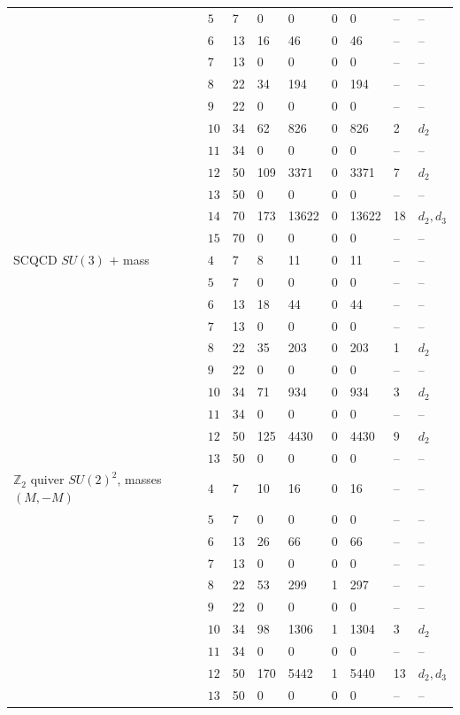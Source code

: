 \documentclass[11pt]{article}
\numberwithin{equation}{section}
\numberwithin{figure}{section}
\numberwithin{table}{section}
\begin{document}
{\begin{xltabular}{\linewidth}{@{}>{\raggedright\arraybackslash}Xllllllll@{}}
 & $5$ & 7 & 0 & 0 & 0 & 0 & -- & --\\
 & $6$ & 13 & 16 & 46 & 0 & 46 & -- & --\\
 & $7$ & 13 & 0 & 0 & 0 & 0 & -- & --\\
 & $8$ & 22 & 34 & 194 & 0 & 194 & -- & --\\
 & $9$ & 22 & 0 & 0 & 0 & 0 & -- & --\\
 & $10$ & 34 & 62 & 826 & 0 & 826 & 2 & $d_2$\\
 & $11$ & 34 & 0 & 0 & 0 & 0 & -- & --\\
 & $12$ & 50 & 109 & 3371 & 0 & 3371 & 7 & $d_2$\\
 & $13$ & 50 & 0 & 0 & 0 & 0 & -- & --\\
 & $14$ & 70 & 173 & 13622 & 0 & 13622 & 18 & $d_2,d_3$\\
 & $15$ & 70 & 0 & 0 & 0 & 0 & -- & --\\
SCQCD $SU(3)$ $+$ mass & $4$ & 7 & 8 & 11 & 0 & 11 & -- & --\\
 & $5$ & 7 & 0 & 0 & 0 & 0 & -- & --\\
 & $6$ & 13 & 18 & 44 & 0 & 44 & -- & --\\
 & $7$ & 13 & 0 & 0 & 0 & 0 & -- & --\\
 & $8$ & 22 & 35 & 203 & 0 & 203 & 1 & $d_2$\\
 & $9$ & 22 & 0 & 0 & 0 & 0 & -- & --\\
 & $10$ & 34 & 71 & 934 & 0 & 934 & 3 & $d_2$\\
 & $11$ & 34 & 0 & 0 & 0 & 0 & -- & --\\
 & $12$ & 50 & 125 & 4430 & 0 & 4430 & 9 & $d_2$\\
 & $13$ & 50 & 0 & 0 & 0 & 0 & -- & --\\
$\mathbb Z_2$ quiver $SU(2)^2$, masses $(M,-M)$ & $4$ & 7 & 10 & 16 & 0 & 16 & -- & --\\
 & $5$ & 7 & 0 & 0 & 0 & 0 & -- & --\\
 & $6$ & 13 & 26 & 66 & 0 & 66 & -- & --\\
 & $7$ & 13 & 0 & 0 & 0 & 0 & -- & --\\
 & $8$ & 22 & 53 & 299 & 1 & 297 & -- & --\\
 & $9$ & 22 & 0 & 0 & 0 & 0 & -- & --\\
 & $10$ & 34 & 98 & 1306 & 1 & 1304 & 3 & $d_2$\\
 & $11$ & 34 & 0 & 0 & 0 & 0 & -- & --\\
 & $12$ & 50 & 170 & 5442 & 1 & 5440 & 13 & $d_2,d_3$\\
 & $13$ & 50 & 0 & 0 & 0 & 0 & -- & --\\
\bottomrule
\end{xltabular}}
\end{document}

